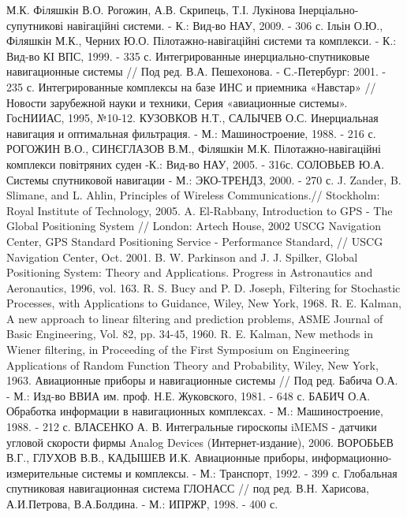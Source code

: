 \begin{thebibliography}{99}
 М.К. Філяшкін В.О. Рогожин, А.В. Скрипець, Т.І. Лукінова Інерціально-супутникові навігаційні  системи. - К.: Вид-во НАУ, 2009. - 306 с.
 Ільін О.Ю., Філяшкін М.К., Черних Ю.О. Пілотажно-навігаційні системи та комплекси. - К.: Вид-во КІ ВПС, 1999. - 335 с.
 Интегрированные инерциально-спутниковые навигационные системы // Под ред. В.А. Пешехонова. -  С.-Петербург: 2001. - 235 с.
 Интегрированные комплексы на базе ИНС и приемника «Навстар» // Новости зарубежной науки и техники, Серия «авиационные системы». ГосНИИАС, 1995, №10-12.
 КУЗОВКОВ Н.Т., САЛЫЧЕВ О.С. Инерциальная навигация и оптимальная фильтрация. - М.: Машиностроение, 1988.  - 216 с.
 РОГОЖИН В.О., СИНЄГЛАЗОВ В.М., Філяшкін М.К. Пілотажно-навігаційні комплекси повітряних суден -К.: Вид-во НАУ, 2005. - 316с.
 СОЛОВЬЕВ Ю.А. Системы спутниковой навигации - М.: ЭКО-ТРЕНДЗ, 2000.  - 270 с. 
 J. Zander, B. Slimane, and L. Ahlin, Principles of Wireless Communications.// Stockholm: Royal Institute of Technology, 2005.
 A. El-Rabbany, Introduction to GPS - The Global Positioning System // London: Artech House, 2002
 USCG Navigation Center, GPS Standard Positioning Service - Performance Standard, // USCG Navigation Center, Oct. 2001.
 B. W. Parkinson and J. J. Spilker, Global Positioning System: Theory and
 Applications. Progress in Astronautics and Aeronautics, 1996, vol. 163.
 R. S. Bucy and P. D. Joseph, Filtering for Stochastic Processes, with Applications to Guidance, Wiley, New York, 1968.
 R. E. Kalman, A new approach to linear filtering and prediction problems, ASME Journal of Basic Engineering, Vol. 82, pp. 34-45, 1960.
 R. E. Kalman, New methods in Wiener filtering,  in Proceeding of the First Symposium on Engineering Applications of 
Random Function Theory and Probability, Wiley, New York, 1963.
 Авиационные приборы и навигационные системы // Под  ред. Бабича О.А. - М.: Изд-во ВВИА им. проф. Н.Е. Жуковского, 1981. - 648 с.
 БАБИЧ О.А. Обработка информации в навигационных комплексах. - М.: Машиностроение, 1988.  - 212 с.
 ВЛАСЕНКО А. В. Интегральные гироскопы iMEMS - датчики угловой скорости фирмы Analog Devices (Интернет-издание), 2006.
 ВОРОБЬЕВ В.Г., ГЛУХОВ В.В., КАДЫШЕВ И.К. Авиационные приборы, информационно-измерительные системы и комплексы. - М.: Транспорт, 1992.  - 399 с.
 Глобальная спутниковая навигационная система ГЛОНАСС // под ред. В.Н. Харисова, А.И.Петрова, В.А.Болдина. - М.: ИПРЖР, 1998.  - 400 с. 
\end{thebibliography}

